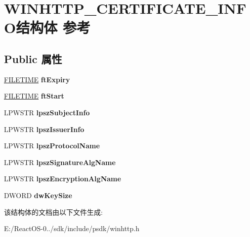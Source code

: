 \hypertarget{struct_w_i_n_h_t_t_p___c_e_r_t_i_f_i_c_a_t_e___i_n_f_o}{}\section{W\+I\+N\+H\+T\+T\+P\+\_\+\+C\+E\+R\+T\+I\+F\+I\+C\+A\+T\+E\+\_\+\+I\+N\+F\+O结构体 参考}
\label{struct_w_i_n_h_t_t_p___c_e_r_t_i_f_i_c_a_t_e___i_n_f_o}
\subsection*{Public 属性}
\begin{DoxyCompactItemize}
\item 
\mbox{\label{struct_w_i_n_h_t_t_p___c_e_r_t_i_f_i_c_a_t_e___i_n_f_o_a71a031bb8f8c85a426b44e422f31a2b3}} 
\hyperlink{struct___f_i_l_e_t_i_m_e}{F\+I\+L\+E\+T\+I\+ME} {\bfseries ft\+Expiry}
\item 
\mbox{\label{struct_w_i_n_h_t_t_p___c_e_r_t_i_f_i_c_a_t_e___i_n_f_o_aeda8db4ebf0159891ea22e7578603724}} 
\hyperlink{struct___f_i_l_e_t_i_m_e}{F\+I\+L\+E\+T\+I\+ME} {\bfseries ft\+Start}
\item 
\mbox{\label{struct_w_i_n_h_t_t_p___c_e_r_t_i_f_i_c_a_t_e___i_n_f_o_a75aa72c9b7aeb7c3cc7c749673530c38}} 
L\+P\+W\+S\+TR {\bfseries lpsz\+Subject\+Info}
\item 
\mbox{\label{struct_w_i_n_h_t_t_p___c_e_r_t_i_f_i_c_a_t_e___i_n_f_o_aa1d3d8c3221594d5578e3c5d9c8391d0}} 
L\+P\+W\+S\+TR {\bfseries lpsz\+Issuer\+Info}
\item 
\mbox{\label{struct_w_i_n_h_t_t_p___c_e_r_t_i_f_i_c_a_t_e___i_n_f_o_ab5854e4cc94245e2ae630250fe4a0088}} 
L\+P\+W\+S\+TR {\bfseries lpsz\+Protocol\+Name}
\item 
\mbox{\label{struct_w_i_n_h_t_t_p___c_e_r_t_i_f_i_c_a_t_e___i_n_f_o_ad5afcdd53d7000c5fc6390c016dd8979}} 
L\+P\+W\+S\+TR {\bfseries lpsz\+Signature\+Alg\+Name}
\item 
\mbox{\label{struct_w_i_n_h_t_t_p___c_e_r_t_i_f_i_c_a_t_e___i_n_f_o_adaf583ea5a151dc25f9568dbd70f611d}} 
L\+P\+W\+S\+TR {\bfseries lpsz\+Encryption\+Alg\+Name}
\item 
\mbox{\label{struct_w_i_n_h_t_t_p___c_e_r_t_i_f_i_c_a_t_e___i_n_f_o_a3d80fb198fdc6096a553bced1c9ff4a5}} 
D\+W\+O\+RD {\bfseries dw\+Key\+Size}
\end{DoxyCompactItemize}


该结构体的文档由以下文件生成\+:\begin{DoxyCompactItemize}
\item 
E\+:/\+React\+O\+S-\/0../sdk/include/psdk/winhttp.\+h\end{DoxyCompactItemize}
